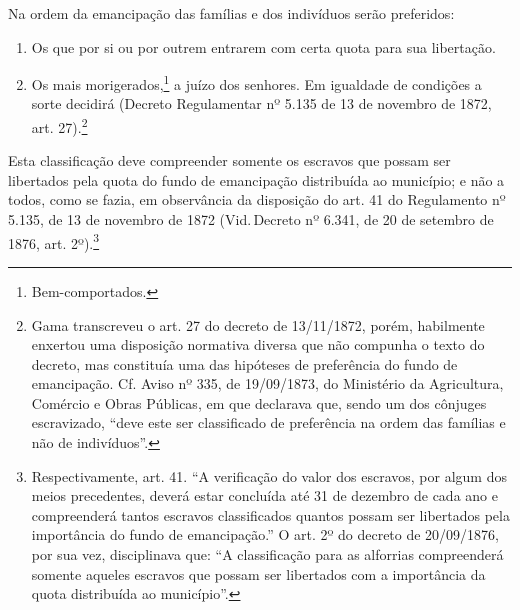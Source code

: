 Na ordem da emancipação das famílias e dos indivíduos serão preferidos:

\begin{enumerate}[label=\arabic*º]
\item Os que por si ou por outrem entrarem com certa quota para sua
libertação.

\item Os mais morigerados,\footnote{Bem-comportados.} a juízo dos
senhores. Em igualdade de condições a sorte decidirá (Decreto
Regulamentar nº 5.135 de 13 de novembro de 1872, art. 27).\footnote{
  Gama transcreveu o art. 27 do decreto de 13/11/1872, porém, habilmente
  enxertou uma disposição normativa diversa que não compunha o texto do
  decreto, mas constituía uma das hipóteses de preferência do
  fundo de emancipação. Cf. Aviso nº 335, de 19/09/1873, do Ministério
  da Agricultura, Comércio e Obras Públicas, em que declarava que, sendo
  um dos cônjuges escravizado, ``deve este ser classificado de
  preferência na ordem das famílias e não de indivíduos''.}
\end{enumerate}  

Esta classificação deve compreender somente os escravos que possam ser
libertados pela quota do fundo de emancipação distribuída ao município;
e não a todos, como se fazia, em observância da disposição do art. 41 do
Regulamento nº 5.135, de 13 de novembro de 1872
(Vid.\,Decreto nº 6.341,
de 20 de setembro de 1876, art. 2º).\footnote{Respectivamente, art.
  41. ``A verificação do valor dos escravos, por algum dos meios
  precedentes, deverá estar concluída até 31 de dezembro de cada ano e
  compreenderá tantos escravos classificados quantos possam ser
  libertados pela importância do fundo de emancipação.'' O art. 2º do
  decreto de 20/09/1876, por sua vez, disciplinava que: ``A classificação
  para as alforrias compreenderá somente aqueles escravos que possam ser
  libertados com a importância da quota distribuída ao município''.}

